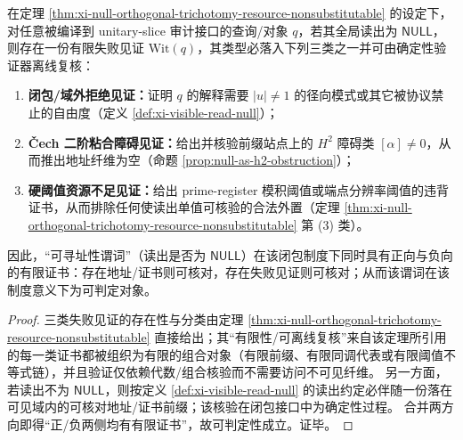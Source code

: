 \begin{corollary}\label{cor:xi-unitary-slice-decidable}
在定理 \ref{thm:xi-null-orthogonal-trichotomy-resource-nonsubstitutable} 的设定下，对任意被编译到 unitary-slice 审计接口的查询/对象 \(q\)，若其全局读出为 \(\mathsf{NULL}\)，则存在一份有限失败见证 \(\mathrm{Wit}(q)\)，其类型必落入下列三类之一并可由确定性验证器离线复核：
\begin{enumerate}
  \item \textbf{闭包/域外拒绝见证：}证明 \(q\) 的解释需要 \(|u|\neq 1\) 的径向模式或其它被协议禁止的自由度（定义 \ref{def:xi-visible-read-null}）；
  \item \textbf{Čech 二阶粘合障碍见证：}给出并核验前缀站点上的 \(H^2\) 障碍类 \([\alpha]\neq 0\)，从而推出地址纤维为空（命题 \ref{prop:null-as-h2-obstruction}）；
  \item \textbf{硬阈值资源不足见证：}给出 prime-register 模积阈值或端点分辨率阈值的违背证书，从而排除任何使读出单值可核验的合法外置（定理 \ref{thm:xi-null-orthogonal-trichotomy-resource-nonsubstitutable} 第 (3) 类）。
\end{enumerate}
因此，“可寻址性谓词”（读出是否为 \(\mathsf{NULL}\)）在该闭包制度下同时具有正向与负向的有限证书：存在地址/证书则可核对，存在失败见证则可核对；从而该谓词在该制度意义下为可判定对象。
\end{corollary}
\begin{proof}
三类失败见证的存在性与分类由定理 \ref{thm:xi-null-orthogonal-trichotomy-resource-nonsubstitutable} 直接给出；其“有限性/可离线复核”来自该定理所引用的每一类证书都被组织为有限的组合对象（有限前缀、有限同调代表或有限阈值不等式链），并且验证仅依赖代数/组合核验而不需要访问不可见纤维。
另一方面，若读出不为 \(\mathsf{NULL}\)，则按定义 \ref{def:xi-visible-read-null} 的读出约定必伴随一份落在可见域内的可核对地址/证书前缀；该核验在闭包接口中为确定性过程。
合并两方向即得“正/负两侧均有有限证书”，故可判定性成立。证毕。
\end{proof}

\endinput
